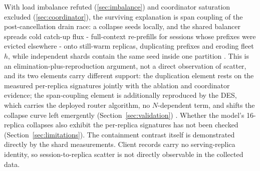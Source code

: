 With load imbalance refuted (\ref{sec:imbalance}) and coordinator saturation
excluded (\ref{sec:coordinator}), the surviving explanation is span coupling of the
post-cancellation drain race: a collapse seeds locally, and the
shared balancer spreads cold catch-up flux - full-context
re-prefills for sessions whose prefixes were evicted elsewhere -
onto still-warm replicas, duplicating prefixes and eroding fleet $h$,
while independent shards contain the same seed inside one partition
. This is an elimination-plus-reproduction argument, not a
direct observation of scatter, and its two elements carry different
support: the duplication element rests on the measured per-replica
signatures jointly with the ablation and coordinator evidence; the
span-coupling element is additionally reproduced by the DES, which
carries the deployed router algorithm, no $N$-dependent term, and
shifts the collapse curve left emergently (Section~\ref{sec:validation}) .
Whether the model's 16-replica collapses also exhibit the
per-replica signatures has not been checked (Section~\ref{sec:limitations}). The
containment contrast itself is demonstrated directly by the shard
measurements. Client records carry no serving-replica identity, so
session-to-replica scatter is not directly observable in the
collected data.
